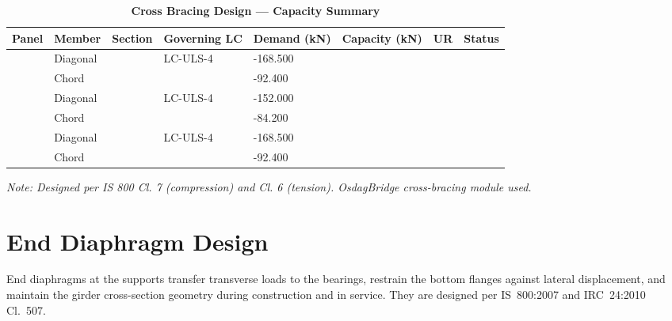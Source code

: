 \documentclass[12pt,a4paper]{report}
\numberwithin{table}{chapter}
\numberwithin{figure}{chapter}
\begin{document}
\vspace{1em}
\begin{longtable}{|C{2.0cm}|L{1.8cm}|C{2.2cm}|C{3.0cm}|C{1.8cm}|C{1.8cm}|C{1.2cm}|C{1.8cm}|}
\caption{\textbf{Cross Bracing Design --- Capacity Summary}}
\hline
\textbf{Panel} & \textbf{Member} & \textbf{Section} & \textbf{Governing LC} & \textbf{Demand (kN)} & \textbf{Capacity (kN)} & \textbf{UR} & \textbf{Status} \\[6pt]
\hline
{} & Diagonal &  & LC-ULS-4 & -168.500 &  &  &  \\[6pt]
 & Chord &  &  & -92.400 &  &  &  \\[6pt]
\hline
{} & Diagonal &  & LC-ULS-4 & -152.000 &  &  &  \\[6pt]
 & Chord &  &  & -84.200 &  &  &  \\[6pt]
\hline
{} & Diagonal &  & LC-ULS-4 & -168.500 &  &  &  \\[6pt]
 & Chord &  &  & -92.400 &  &  &  \\[6pt]
\hline
\end{longtable}
\noindent\textit{Note: Designed per IS 800 Cl. 7 (compression) and Cl. 6 (tension). OsdagBridge cross-bracing module used.}

\section{End Diaphragm Design}
\label{sec:end-diaphragm}

End diaphragms at the supports transfer transverse loads to the bearings, restrain the bottom flanges against lateral displacement, and maintain the girder cross-section geometry during construction and in service. They are designed per IS~800:2007 and IRC~24:2010 Cl.~507.

\vspace{1em}

\vspace{0.4em}
\noindent
\setlength{\tabcolsep}{4pt}
\setlength{\LTleft}{0pt}
\setlength{\LTright}{\fill}
\end{document}
